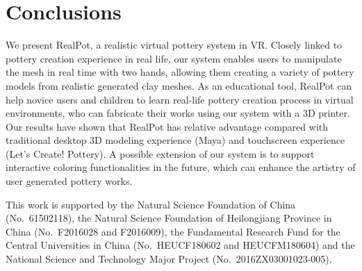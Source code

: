 \documentclass{svjour3}                     %
\begin{document}
\section{Conclusions}
\label{sec:8}

We present RealPot, a realistic virtual pottery system in VR.
Closely linked to pottery creation experience in real life, our system enables users to manipulate the mesh in real time with two hands, allowing them creating a variety of pottery models from realistic generated clay meshes.
As an educational tool, RealPot can help novice users and children to learn real-life pottery creation process in virtual environments, who can fabricate their works using our system with a 3D printer.
Our results have shown that RealPot has relative advantage compared with traditional desktop 3D modeling experience (Maya) and touchscreen experience (Let's Create! Pottery).
A possible extension of our system is to support interactive coloring functionalities in the future, which can enhance the artistry of user generated pottery works.


\begin{acknowledgements}
This work is supported by the Natural Science Foundation of China (No.~61502118), the Natural Science Foundation of Heilongjiang Province in China (No.~F2016028 and F2016009), the Fundamental Research Fund for the Central Universities in China (No.~HEUCF180602 and HEUCFM180604) and the National Science and Technology Major Project (No.~2016ZX03001023-005).
\end{acknowledgements}


%
%
\end{document}
